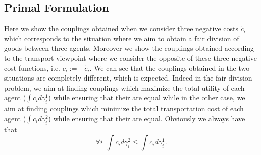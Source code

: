 \subsection{Primal Formulation}
Here we show the couplings obtained when we consider three negative costs $\tilde{c}_i$ which corresponds to the situation where we aim to obtain a fair division of goods between three agents. Moreover we show the couplings obtained according to the transport viewpoint where we consider the opposite of these three negative cost functions, i.e. $c_i:=-\tilde{c}_i$. We can see that the couplings obtained in the two situations are completely different, which is expected. Indeed in the fair division problem, we aim at finding couplings which maximize the total utility of each agent ($\int c_id\gamma_i^{1}$) while ensuring that their are equal while in the other case, we aim at finding couplings which minimize the total transportation cost of each agent ($\int c_id\gamma_i^{2}$) while ensuring that their are equal. Obviously we always have 
that  $$\forall i~~\int c_id\gamma_i^{2}\leq \int c_id\gamma_i^{1}.$$

